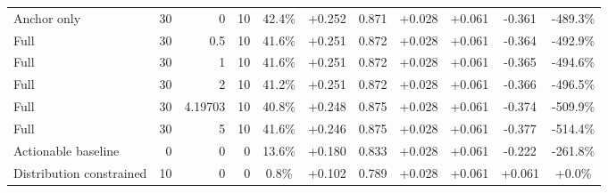 \begin{table}[htbp]
\begin{tabular}{lrrrccccccc}
Anchor only & 30 & 0 & 10 & 42.4\% & +0.252 & 0.871 & +0.028 & +0.061 & -0.361 & -489.3\% \\
Full & 30 & 0.5 & 10 & 41.6\% & +0.251 & 0.872 & +0.028 & +0.061 & -0.364 & -492.9\% \\
Full & 30 & 1 & 10 & 41.6\% & +0.251 & 0.872 & +0.028 & +0.061 & -0.365 & -494.6\% \\
Full & 30 & 2 & 10 & 41.2\% & +0.251 & 0.872 & +0.028 & +0.061 & -0.366 & -496.5\% \\
Full & 30 & 4.19703 & 10 & 40.8\% & +0.248 & 0.875 & +0.028 & +0.061 & -0.374 & -509.9\% \\
Full & 30 & 5 & 10 & 41.6\% & +0.246 & 0.875 & +0.028 & +0.061 & -0.377 & -514.4\% \\
Actionable baseline & 0 & 0 & 0 & 13.6\% & +0.180 & 0.833 & +0.028 & +0.061 & -0.222 & -261.8\% \\
Distribution constrained & 10 & 0 & 0 & 0.8\% & +0.102 & 0.789 & +0.028 & +0.061 & +0.061 & +0.0\% \\
\bottomrule
\end{tabular}
\end{table}